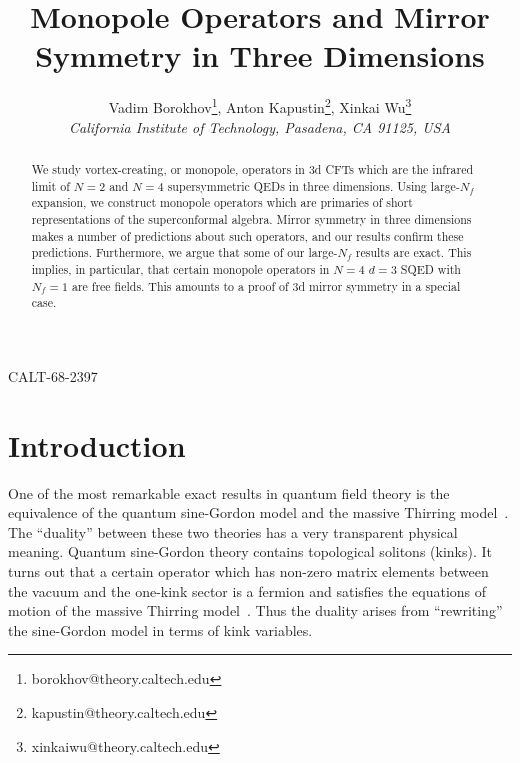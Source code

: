 \documentclass[a4paper,12pt, amsfonts, amssymb]{article}
\title{\bf \Large Monopole Operators and Mirror Symmetry in Three Dimensions}
\author{Vadim Borokhov\thanks{borokhov@theory.caltech.edu}, Anton Kapustin\thanks{kapustin@theory.caltech.edu}, Xinkai Wu\thanks{xinkaiwu@theory.caltech.edu}\\
\it California Institute of Technology, Pasadena, CA 91125, USA
}
\begin{document}
\begin{titlepage}

\renewcommand{\thepage}{ }

\maketitle

\begin{abstract}

We study vortex-creating, or monopole, operators in 3d CFTs which
are the infrared limit of $N=2$ and $N=4$ supersymmetric QEDs in
three dimensions. Using large-$N_f$ expansion, we construct monopole 
operators which are primaries of short representations of the superconformal
algebra. Mirror symmetry in three dimensions makes a number of predictions about such operators, and our results confirm these predictions. Furthermore,
we argue that some of our large-$N_f$ results are exact. This implies, in particular, that certain monopole operators in $N=4$ $d=3$ SQED with $N_f=1$ are free fields. This amounts to a proof of 3d mirror symmetry in a special case.

\end{abstract}

\vspace{-6.5in}

\parbox{\linewidth}
{\small\hfill CALT-68-2397}

\end{titlepage}


\section{Introduction}

One of the most remarkable exact results in quantum field theory is the
equivalence of the quantum sine-Gordon model and the massive Thirring
model~\cite{Coleman,Mandelstam}. The ``duality'' between these two
theories has a very transparent physical meaning. Quantum sine-Gordon 
theory contains topological solitons (kinks). It turns out that
a certain operator which has non-zero matrix elements between the vacuum
and the one-kink sector is a fermion and satisfies the equations of
motion of the massive Thirring model~\cite{Mandelstam}. Thus
the duality arises from ``rewriting'' the sine-Gordon model in terms
of kink variables. 
\end{document}
